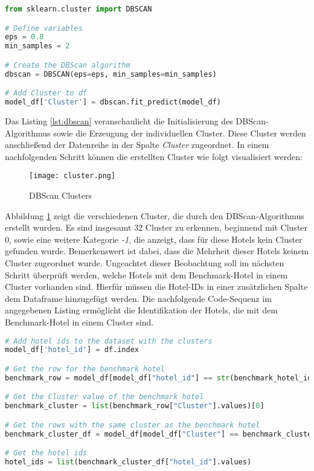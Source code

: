 \begin{lstlisting}[language=Python, label=lst:dbscan, caption=Ausführung des DBScan-Algorithmus]
from sklearn.cluster import DBSCAN

# Define variables
eps = 0.8
min_samples = 2 

# Create the DBScan algorithm
dbscan = DBSCAN(eps=eps, min_samples=min_samples)

# Add Cluster to df
model_df['Cluster'] = dbscan.fit_predict(model_df)
\end{lstlisting}

Das Listing \ref{lst:dbscan} veranschaulicht die Initialisierung des DBScan-Algorithmus sowie die Erzeugung der individuellen Cluster. Diese Cluster werden anschließend der Datenreihe in der Spalte \emph{Cluster} zugeordnet.
\newline
\newline
In einem nachfolgenden Schritt können die erstellten Cluster wie folgt visualisiert werden:

\begin{figure}[h]
    \centering
    \texttt{[image: cluster.png]}
    \caption[DBScan Clusters]{DBScan Clusters}
    \label{img:cluster}
\end{figure}

Abbildung \ref{img:cluster} zeigt die verschiedenen Cluster, die durch den DBScan-Algorithmus erstellt wurden. Es sind insgesamt 32 Cluster zu erkennen, beginnend mit Cluster 0, sowie eine weitere Kategorie \emph{-1}, die anzeigt, dass für diese Hotels kein Cluster gefunden wurde. Bemerkenswert ist dabei, dass die Mehrheit dieser Hotels keinem Cluster zugeordnet wurde.
\newline
\newline
Ungeachtet dieser Beobachtung soll im nächsten Schritt überprüft werden, welche Hotels mit dem Benchmark-Hotel in einem Cluster vorhanden sind. Hierfür müssen die Hotel-IDs in einer zusätzlichen Spalte dem Dataframe hinzugefügt werden. Die nachfolgende Code-Sequenz im angegebenen Listing ermöglicht die Identifikation der Hotels, die mit dem Benchmark-Hotel in einem Cluster sind.

\begin{lstlisting}[language=Python, label=lst:dbscan_values, caption=Finden alle Hotel ID´s innerhalb des gleichen Clusters]
# Add hotel ids to the dataset with the clusters
model_df['hotel_id'] = df.index

# Get the row for the benchmark hotel
benchmark_row = model_df[model_df["hotel_id"] == str(benchmark_hotel_id)]

# Get the Cluster value of the benchmark hotel
benchmark_cluster = list(benchmark_row["Cluster"].values)[0]

# Get the rows with the same cluster as the benchmark hotel
benchmark_cluster_df = model_df[model_df["Cluster"] == benchmark_cluster]

# Get the hotel ids 
hotel_ids = list(benchmark_cluster_df["hotel_id"].values)
\end{lstlisting}

